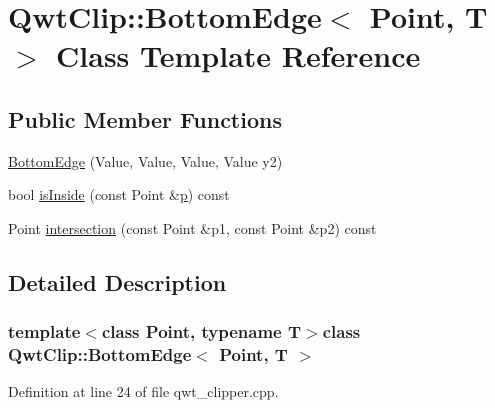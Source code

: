 \hypertarget{class_qwt_clip_1_1_bottom_edge}{\section{Qwt\-Clip\-:\-:Bottom\-Edge$<$ Point, T $>$ Class Template Reference}
\label{class_qwt_clip_1_1_bottom_edge}
}
\subsection*{Public Member Functions}
\begin{DoxyCompactItemize}
\item 
\hyperlink{class_qwt_clip_1_1_bottom_edge_aa1ac022e976a9e2c54bf0c4a266f3c35}{Bottom\-Edge} (Value, Value, Value, Value y2)
\item 
bool \hyperlink{class_qwt_clip_1_1_bottom_edge_af2b3ac01998dab1e99fa5a24474b446f}{is\-Inside} (const Point \&\hyperlink{glext_8h_aa5367c14d90f462230c2611b81b41d23}{p}) const 
\item 
Point \hyperlink{class_qwt_clip_1_1_bottom_edge_a34bdc6ebed9be4da12cf0b6e5bb7ee95}{intersection} (const Point \&p1, const Point \&p2) const 
\end{DoxyCompactItemize}


\subsection{Detailed Description}
\subsubsection*{template$<$class Point, typename T$>$class Qwt\-Clip\-::\-Bottom\-Edge$<$ Point, T $>$}



Definition at line 24 of file qwt\-\_\-clipper.\-cpp.



